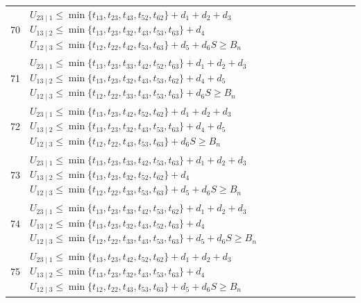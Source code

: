 \documentclass[a4paper,11pt]{amsart}
\numberwithin{equation}{section}
\theoremstyle{definition}
\theoremstyle{remark}
\begin{document}
{\begin{longtable}{@{}r>{\raggedright\arraybackslash}p{12.9cm}@{}}
70 & \(U_{23\mid 1}\leq \min\{t_{13},t_{23},t_{43},t_{52},t_{62}\}+d_{1}+d_{2}+d_{3}\)\newline \(U_{13\mid 2}\leq \min\{t_{13},t_{23},t_{32},t_{43},t_{53},t_{63}\}+d_{4}\)\newline \(U_{12\mid 3}\leq \min\{t_{12},t_{22},t_{42},t_{53},t_{63}\}+d_{5}+d_{6}\)\newline \(S\geq B_n\)\\[3pt]
71 & \(U_{23\mid 1}\leq \min\{t_{13},t_{23},t_{33},t_{42},t_{52},t_{63}\}+d_{1}+d_{2}+d_{3}\)\newline \(U_{13\mid 2}\leq \min\{t_{13},t_{23},t_{32},t_{43},t_{53},t_{62}\}+d_{4}+d_{5}\)\newline \(U_{12\mid 3}\leq \min\{t_{12},t_{22},t_{33},t_{43},t_{53},t_{63}\}+d_{6}\)\newline \(S\geq B_n\)\\[3pt]
72 & \(U_{23\mid 1}\leq \min\{t_{13},t_{23},t_{42},t_{52},t_{62}\}+d_{1}+d_{2}+d_{3}\)\newline \(U_{13\mid 2}\leq \min\{t_{13},t_{23},t_{32},t_{43},t_{53},t_{63}\}+d_{4}+d_{5}\)\newline \(U_{12\mid 3}\leq \min\{t_{12},t_{22},t_{43},t_{53},t_{63}\}+d_{6}\)\newline \(S\geq B_n\)\\[3pt]
73 & \(U_{23\mid 1}\leq \min\{t_{13},t_{23},t_{33},t_{42},t_{53},t_{63}\}+d_{1}+d_{2}+d_{3}\)\newline \(U_{13\mid 2}\leq \min\{t_{13},t_{23},t_{32},t_{52},t_{62}\}+d_{4}\)\newline \(U_{12\mid 3}\leq \min\{t_{12},t_{22},t_{33},t_{53},t_{63}\}+d_{5}+d_{6}\)\newline \(S\geq B_n\)\\[3pt]
74 & \(U_{23\mid 1}\leq \min\{t_{13},t_{23},t_{33},t_{42},t_{53},t_{62}\}+d_{1}+d_{2}+d_{3}\)\newline \(U_{13\mid 2}\leq \min\{t_{13},t_{23},t_{32},t_{43},t_{52},t_{63}\}+d_{4}\)\newline \(U_{12\mid 3}\leq \min\{t_{12},t_{22},t_{33},t_{43},t_{53},t_{63}\}+d_{5}+d_{6}\)\newline \(S\geq B_n\)\\[3pt]
75 & \(U_{23\mid 1}\leq \min\{t_{13},t_{23},t_{42},t_{52},t_{62}\}+d_{1}+d_{2}+d_{3}\)\newline \(U_{13\mid 2}\leq \min\{t_{13},t_{23},t_{32},t_{43},t_{53},t_{63}\}+d_{4}\)\newline \(U_{12\mid 3}\leq \min\{t_{12},t_{22},t_{43},t_{53},t_{63}\}+d_{5}+d_{6}\)\newline \(S\geq B_n\)\\[3pt]

\end{longtable}}
\end{document}
